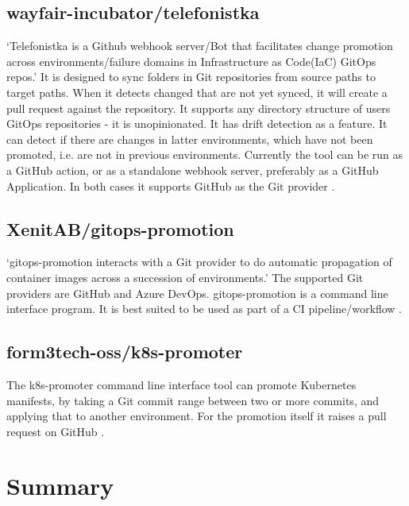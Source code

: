 \subsection*{wayfair-incubator/telefonistka}

\enquote*{Telefonistka is a Github webhook server/Bot that facilitates change promotion across environments/failure domains in Infrastructure as Code(IaC) GitOps repos.}
\autocite{telefonistka}
It is designed to sync folders in Git repositories from source paths to target paths.
When it detects changed that are not yet synced,
it will create a pull request against the repository.
It supports any directory structure of users GitOps repositories -
it is unopinionated.
It has drift detection as a feature. It can detect if there are changes in
latter environments, which have not been promoted, i.e. are not in previous environments.
Currently the tool can be run as a GitHub action, or as a
standalone webhook server, preferably as a GitHub Application.
In both cases it supports GitHub as the Git provider
\autocite{telefonistka}.

\subsection*{XenitAB/gitops-promotion}

\enquote*{gitops-promotion interacts with a Git provider to do automatic propagation of container images across a succession of environments.}
\autocite{xenitABgitopsPromotion}
The supported Git providers are GitHub and Azure DevOps.
gitops-promotion is a command line interface program.
It is best suited to be used as part of a CI pipeline/workflow
\autocite{xenitABgitopsPromotion}.

\subsection*{form3tech-oss/k8s-promoter}

The k8s-promoter command line interface tool can promote Kubernetes manifests, by
taking a Git commit range between two or more commits, and applying that to another environment.
For the promotion itself it raises a pull request on GitHub
\autocite{form3techK8sPromoter}.

\section{Summary}

